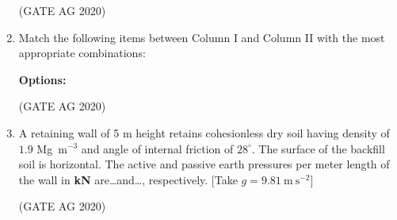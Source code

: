 \documentclass[journal]{IEEEtran}
\begin{document}
\begin{enumerate}
\begin{enumerate}
\end{enumerate}
\hfill(GATE AG 2020)\\

\medskip

\item
Match the following items between Column I and Column II with the most appropriate combinations:



\noindent
\textbf{Options:}
\begin{enumerate}
\end{enumerate}
\hfill(GATE AG 2020)\\

\medskip

\item
A retaining wall of 5 m height retains cohesionless dry soil having density of \(1.9\) Mg~m\(^{-3}\) and angle of internal friction of \(28^\circ\).
The surface of the backfill soil is horizontal.
The active and passive earth pressures per meter length of the wall in \textbf{kN} are\dots and\dots, respectively. 
\textnormal{[Take \(g = 9.81~\mathrm{m~s^{-2}}\)]}

\begin{enumerate}
\end{enumerate}
\hfill(GATE AG 2020)\\

\medskip


\end{enumerate}
\end{document}
